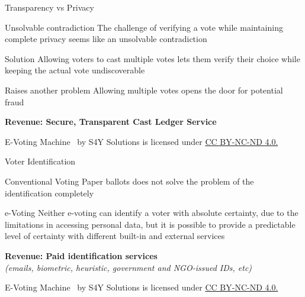 \documentclass[12pt]{beamer}
\newcommand{\currentyear}{\the\year} %
\newcommand{\copyrightnote}{
    \vfill
    \begin{flushleft}
    \tiny
    E-Voting Machine \textcopyright \currentyear~by S4Y Solutions is licensed under \href{https://creativecommons.org/licenses/by-nc-nd/4.0}{CC BY-NC-ND 4.0.}
    \end{flushleft}
}
\begin{document}
    \begin{frame}[allowframebreaks]{Transparency vs Privacy}
        \vfill
        \begin{block}{Unsolvable contradiction}
            The challenge of verifying a vote while maintaining complete privacy seems like an unsolvable contradiction
        \end{block}

        \begin{exampleblock}{Solution}
            Allowing voters to cast multiple votes lets them verify their choice while keeping the actual vote
            undiscoverable
        \end{exampleblock}

        \begin{alertblock}{Raises another problem}
            Allowing multiple votes opens the door for potential fraud
        \end{alertblock}
        \vfill
        \textbf{Revenue: Secure, Transparent Cast Ledger Service}
        \copyrightnote
    \end{frame}

    \begin{frame}[allowframebreaks]{Voter Identification}
        \vfill

        \begin{block}{Conventional Voting}
            Paper ballots does not solve the problem of the identification completely
        \end{block}

        \begin{exampleblock}{e-Voting}
            Neither e-voting can identify a voter with absolute certainty, due to the limitations in accessing personal
            data, but it is possible to provide a predictable level of certainty with different built-in and external
            services
        \end{exampleblock}
        \vfill
        \textbf{Revenue: Paid identification services}\\
        \scriptsize{\textit{(emails, biometric, heuristic, government and NGO-issued IDs, etc)}}

        \copyrightnote
    \end{frame}
\end{document}
